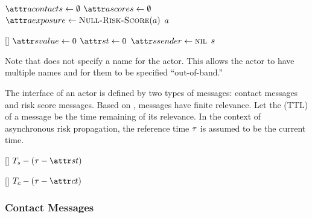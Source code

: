 %
\begin{function}{\nCreateActor}
    \State $\aActorContacts \assign \emptyset$
    \State $\aActorScores \assign \emptyset$
    \State $\aActorExposure \assign \cNullRiskScore[\vActor]$
    \State \Return $a$
\end{function}
%
\begin{function}{\nNullRiskScore}[\vActor]
    \State $\aScoreValue \assign 0$
    \State $\aScoreTime \assign 0$
    \State $\aScoreSender \assign \nil$
    \State \Return $s$
\end{function}
%
Note that \cCreateActor{} does not specify a name for the actor. This allows the actor to have multiple names and for them to be specified ``out-of-band.''

The interface of an actor is defined by two types of messages: contact messages and risk score messages. Based on , messages have finite relevance. Let the  (TTL) of a message be the time remaining of its relevance. In the context of asynchronous risk propagation, the reference time $\tau$ is assumed to be the current time.
%
\begin{function}{\nRiskScoreTtl}[\vScore]
  \State \Return $\pScoreExpiry - (\vRefTime - \aScoreTime)$
\end{function}
\begin{function}{\nContactTtl}[\vContact]
  \State \Return $\pContactExpiry - (\vRefTime - \aContactTime)$
\end{function}

\subsubsection{Contact Messages}

